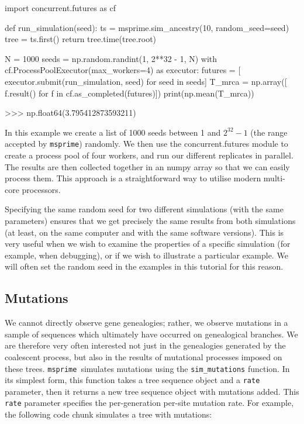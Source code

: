 \documentclass[graybox]{svmult}
\newcommand{\msprime}[0]{\texttt{msprime}}
\begin{document}
\begin{pythoncode}
import concurrent.futures as cf

def run_simulation(seed):
    ts = msprime.sim_ancestry(10, random_seed=seed)
    tree = ts.first()
    return tree.time(tree.root)

N = 1000
seeds = np.random.randint(1, 2**32 - 1, N)
with cf.ProcessPoolExecutor(max_workers=4) as executor:
    futures = [
        executor.submit(run_simulation, seed) for seed in seeds]
    T_mrca = np.array([
        f.result() for f in cf.as_completed(futures)])
print(np.mean(T_mrca))

>>> np.float64(3.795412873593211)
\end{pythoncode}

    In this example we create a list of 1000 seeds between 1 and $2^{32} -
1$ (the range accepted by \msprime) randomly. We then use the
concurrent.futures module to create a process pool of four workers, and
run our different replicates in parallel. The results are then
collected together in an numpy array so that we can easily process them.
This approach is a straightforward way to utilise modern
multi-core processors.

Specifying the same random seed for two different simulations (with the
same parameters) ensures that we get precisely the same results from
both simulations (at least, on the same computer and with the same
software versions). This is very useful when we wish to examine the
properties of a specific simulation (for example, when debugging), or if
we wish to illustrate a particular example. We will often set the random
seed in the examples in this tutorial for this reason.

\subsection{Mutations}\label{mutations}

We cannot directly observe gene genealogies; rather, we observe mutations in a sample of sequences which ultimately have occurred on genealogical branches. We are
therefore very often interested not just in the genealogies generated by the coalescent process, but also in the results of
mutational processes imposed on these trees. \msprime\ simulates mutations using the \texttt{sim\_mutations} function. In its simplest form, this function takes
a tree sequence object and a \texttt{rate} parameter, then it returns a new tree sequence object with mutations added. This \texttt{rate} parameter specifies the
per-generation per-site mutation rate. For example, the following code chunk simulates a tree with mutations:
\end{document}
